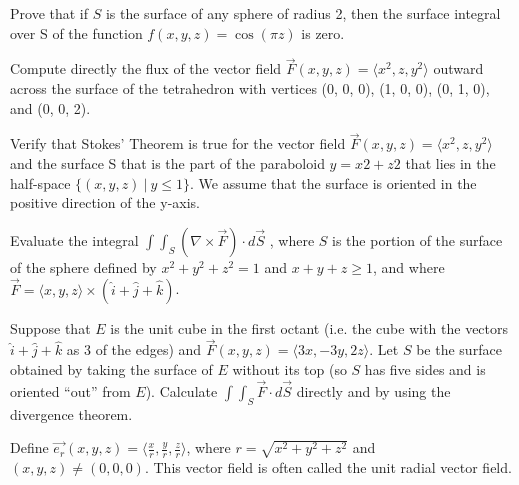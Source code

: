 \documentclass[12pt]{exam}
\begin{document}
\begin{questions}

\question Prove that if $S$ is the surface of any sphere of radius 2, then the surface integral over S of the function $f (x, y, z) = \cos(\pi z)$ is zero.

\question Compute directly the flux of the vector field $\overrightarrow{F}(x, y, z) = \langle x^2, z, y^2 \rangle$ outward across the surface of the tetrahedron with vertices (0, 0, 0), (1, 0, 0), (0, 1, 0), and (0, 0, 2).

\question Verify that Stokes' Theorem is true for the vector field $\overrightarrow{F}(x, y, z) = \langle x^2, z, y^2 \rangle$ and the surface S that is the part of the paraboloid $y = x2 + z2$ that lies in the half-space $\{(x, y, z)\ |\ y \leq 1\}$. We assume that the surface is oriented in the positive direction of the y-axis.

\question Evaluate the integral $\int \int_S (\nabla \times \overrightarrow{F}) \cdot d\overrightarrow{S}$ , where $S$ is the portion of the surface of the sphere defined by
$x^2 + y^2 + z^2 = 1$ and $x + y + z \geq 1$, and where $\overrightarrow{F} = \langle x, y, z \rangle \times \left(\hat{i} + \hat{j} + \hat{k}\right)$.

Suppose that $E$ is the unit cube in the first octant (i.e. the cube with the vectors $\hat{i} + \hat{j} + \hat{k}$ as 3 of the edges) and $\overrightarrow{F} (x, y, z) = \langle 3x, -3y, 2z\rangle$. Let $S$ be the surface obtained by taking the surface of $E$ without its top (so $S$ has five sides and is oriented “out” from $E$). Calculate $\int\int_S \overrightarrow{F} \cdot d \overrightarrow{S}$ directly and by using
the divergence theorem.

\question Define $ \overrightarrow{e_r}(x, y, z) = \langle \frac{x}{r}, \frac{y}{r}, \frac{z}{r} \rangle$, where $r = \sqrt{x^2 + y^2 + z^2}$ and $(x, y, z) \neq (0, 0, 0)$. This vector field is often called the unit radial vector field.
\end{questions}
\end{document}
